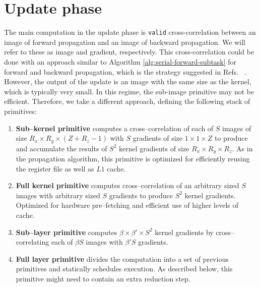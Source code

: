 \section{Update phase}

The main computation in the update phase is {\tt valid}
cross-correlation between an image of forward propagation and an image
of backward propagation. We will refer to these as image and gradient,
respectively.  This cross-correlation could be done with an approach
similar to Algorithm \ref{alg:serial-forward-subtask} for forward and
backward propagation, which is the strategy suggested in
Refs. ~\cite{chellapilla2006high,das2016distributed}.  However, the
output of the update is an image with the same size as the kernel,
which is typically very small.  In this regime, the sub-image
primitive may not be efficient.  Therefore, we take a different
approach, defining the following stack of primitives:
  \begin{enumerate}
    \item {\bf Sub--kernel primitive} computes a cross--correlation of
      each of $S$ images of size $R_x \times R_y \times (Z + R_z - 1)$
      with $S$ gradients of size $1 \times 1 \times Z$ to produce and
      accumulate the results of $S^2$ kernel gradients of size $R_x
      \times R_y \times R_z$.  As in the propagation algorithm, this
      primitive is optimized for efficiently reusing the register file
      as well as $L1$ cache.
    \item {\bf Full kernel primitive} computes cross--correlation of
      an arbitrary sized $S$ images with arbitrary sized $S$ gradients
      to produce $S^2$ kernel gradients.  Optimized for hardware
      pre--fetching and efficient use of higher levels of cache.
    \item {\bf Sub--layer primitive} computes $\beta \times \beta'
      \times S^2$ kernel gradients by cross--correlating each of
      $\beta S$ images with $\beta' S$ gradients.
    \item {\bf Full layer primitive} divides the computation into a
      set of previous primitives and statically schedules execution.
      As described below, this primitive might need to contain an
      extra reduction step.
  \end{enumerate}


